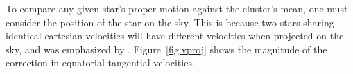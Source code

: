 \documentclass[12pt,twocolumn,tighten]{aastex63}
\begin{document}
To compare any given star's proper motion against the cluster's mean,
one must consider the position of the star on the sky.  This is
because two stars sharing identical cartesian velocities will have
different velocities when projected on the sky, and was emphasized by
\citet{meingast_2021}.
Figure~\ref{fig:vproj} shows the magnitude of the correction in
equatorial tangential velocities.


% 
% 
\end{document}
